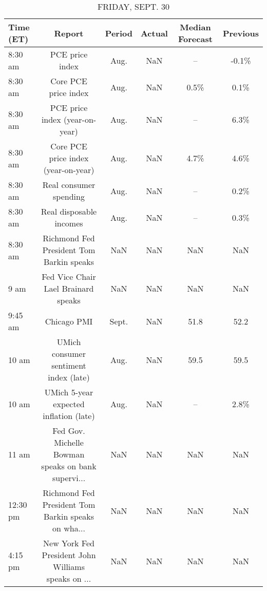 \documentclass{article}%
\begin{document}
\begin{table}[htbp]%
\caption{FRIDAY, SEPT. 30}%
\centering%
\begin{adjustbox}{width=1\textwidth}%
\begin{tabular}{lccccc}
\toprule
Time (ET) &                                             Report & Period & Actual & Median Forecast & Previous \\
\midrule
  8:30 am &                                    PCE price index &   Aug. &    NaN &              -- &    -0.1\% \\
  8:30 am &                               Core PCE price index &   Aug. &    NaN &            0.5\% &     0.1\% \\
  8:30 am &                     PCE price index (year-on-year) &   Aug. &    NaN &              -- &     6.3\% \\
  8:30 am &                Core PCE price index (year-on-year) &   Aug. &    NaN &            4.7\% &     4.6\% \\
  8:30 am &                             Real consumer spending &   Aug. &    NaN &              -- &     0.2\% \\
  8:30 am &                            Real disposable incomes &   Aug. &    NaN &              -- &     0.3\% \\
  8:30 am &           Richmond Fed President Tom Barkin speaks &    NaN &    NaN &             NaN &      NaN \\
     9 am &                Fed Vice Chair Lael Brainard speaks &    NaN &    NaN &             NaN &      NaN \\
  9:45 am &                                        Chicago PMI &  Sept. &    NaN &            51.8 &     52.2 \\
    10 am &              UMich consumer sentiment index (late) &   Aug. &    NaN &            59.5 &     59.5 \\
    10 am &             UMich 5-year expected inflation (late) &   Aug. &    NaN &              -- &     2.8\% \\
    11 am & Fed Gov. Michelle Bowman speaks on bank supervi... &    NaN &    NaN &             NaN &      NaN \\
 12:30 pm & Richmond Fed President Tom Barkin speaks on wha... &    NaN &    NaN &             NaN &      NaN \\
  4:15 pm & New York Fed President John Williams speaks on ... &    NaN &    NaN &             NaN &      NaN \\
\bottomrule
\end{tabular}
%
\end{adjustbox}%
\end{table}
\end{document}
